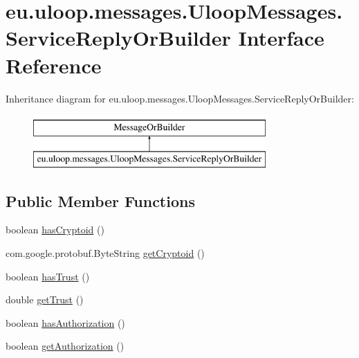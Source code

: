 \hypertarget{interfaceeu_1_1uloop_1_1messages_1_1UloopMessages_1_1ServiceReplyOrBuilder}{\section{eu.\+uloop.\+messages.\+Uloop\+Messages.\+Service\+Reply\+Or\+Builder Interface Reference}
\label{interfaceeu_1_1uloop_1_1messages_1_1UloopMessages_1_1ServiceReplyOrBuilder}
}
Inheritance diagram for eu.\+uloop.\+messages.\+Uloop\+Messages.\+Service\+Reply\+Or\+Builder\+:\begin{figure}[H]
\begin{center}
\leavevmode
\includegraphics[height=2.000000cm]{interfaceeu_1_1uloop_1_1messages_1_1UloopMessages_1_1ServiceReplyOrBuilder}
\end{center}
\end{figure}
\subsection*{Public Member Functions}
\begin{DoxyCompactItemize}
\item 
boolean \hyperlink{interfaceeu_1_1uloop_1_1messages_1_1UloopMessages_1_1ServiceReplyOrBuilder_a00a63d749b092eae1bab0c3c3bf2dcce}{has\+Cryptoid} ()
\item 
com.\+google.\+protobuf.\+Byte\+String \hyperlink{interfaceeu_1_1uloop_1_1messages_1_1UloopMessages_1_1ServiceReplyOrBuilder_a720498654fe93facff572da81cf11b8b}{get\+Cryptoid} ()
\item 
boolean \hyperlink{interfaceeu_1_1uloop_1_1messages_1_1UloopMessages_1_1ServiceReplyOrBuilder_abe924eaca1952c00536fe5d0032dc0a7}{has\+Trust} ()
\item 
double \hyperlink{interfaceeu_1_1uloop_1_1messages_1_1UloopMessages_1_1ServiceReplyOrBuilder_a330d600e46cf197c578dc5bc9b845ba8}{get\+Trust} ()
\item 
boolean \hyperlink{interfaceeu_1_1uloop_1_1messages_1_1UloopMessages_1_1ServiceReplyOrBuilder_ac536738a1e28c718131e24e0f5136723}{has\+Authorization} ()
\item 
boolean \hyperlink{interfaceeu_1_1uloop_1_1messages_1_1UloopMessages_1_1ServiceReplyOrBuilder_ad63f56423b7f94d0efd4e06bd3652180}{get\+Authorization} ()
\end{DoxyCompactItemize}


